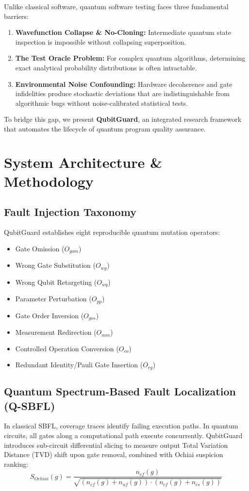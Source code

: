 \documentclass[10pt,journal,compsoc]{IEEEtran}
\begin{document}
Unlike classical software, quantum software testing faces three fundamental barriers:
\begin{enumerate}
    \item \textbf{Wavefunction Collapse \& No-Cloning:} Intermediate quantum state inspection is impossible without collapsing superposition.
    \item \textbf{The Test Oracle Problem:} For complex quantum algorithms, determining exact analytical probability distributions is often intractable.
    \item \textbf{Environmental Noise Confounding:} Hardware decoherence and gate infidelities produce stochastic deviations that are indistinguishable from algorithmic bugs without noise-calibrated statistical tests.
\end{enumerate}

To bridge this gap, we present \textbf{QubitGuard}, an integrated research framework that automates the lifecycle of quantum program quality assurance.

\section{System Architecture \& Methodology}
\subsection{Fault Injection Taxonomy}
QubitGuard establishes eight reproducible quantum mutation operators:
\begin{itemize}
    \item Gate Omission ($O_{gom}$)
    \item Wrong Gate Substitution ($O_{wg}$)
    \item Wrong Qubit Retargeting ($O_{wq}$)
    \item Parameter Perturbation ($O_{pp}$)
    \item Gate Order Inversion ($O_{gos}$)
    \item Measurement Redirection ($O_{mm}$)
    \item Controlled Operation Conversion ($O_{co}$)
    \item Redundant Identity/Pauli Gate Insertion ($O_{rg}$)
\end{itemize}

\subsection{Quantum Spectrum-Based Fault Localization (Q-SBFL)}
In classical SBFL, coverage traces identify failing execution paths. In quantum circuits, all gates along a computational path execute concurrently. QubitGuard introduces sub-circuit differential slicing to measure output Total Variation Distance (TVD) shift upon gate removal, combined with Ochiai suspicion ranking:
\begin{equation}
    S_{Ochiai}(g) = \frac{n_{cf}(g)}{\sqrt{(n_{cf}(g) + n_{uf}(g)) \cdot (n_{cf}(g) + n_{cs}(g))}}
\end{equation}
\end{document}
